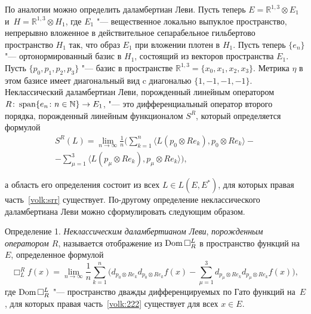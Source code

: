 По аналогии можно определить даламбертиан Леви. Пусть теперь $E=\mathbb{R}^{1,3}\otimes E_1$ и~$H=\mathbb{R}^{1,3}\otimes H_1$, где $E_1$ "--- вещественное локально выпуклое пространство, непрерывно вложенное в действительное
 сепарабельное гильбертово пространство $H_1$ так, что
 образ $E_1$ при вложении плотен в $H_1$. 
 Пусть теперь $\{e_n\}$ "---  ортонормированный базис в $H_1$, состоящий из векторов пространства
$E_1$.
Пусть $\{p_0, p_1, p_2, p_3\}$ "--- базис в пространстве $\mathbb{R}^{1,3}=\{x_0,x_1,x_2,x_3\}$. 
Метрика $\eta$ в этом базисе
имеет диагональный вид c диагональю \mbox{$\{1,-1,-1,-1\}$.}
Неклассический даламбертиан Леви, порожденный линейным  оператором \linebreak 
$R\colon \mathop{\rm span} \{e_n\colon n\in \mathbb{N}\}\to E_1$,
 "--- это дифференциальный оператор второго порядка,
 порожденный линейным  функционалом $S^R$, который определяется формулой
\begin{multline}
\label{volk:srr}
S^R(L)=\lim_{n\to\infty}\frac 1n
\biggl(\sum_{k=1}^n 
\langle L(p_0\otimes Re_k),p_0\otimes Re_k\rangle-\\-\sum_{\mu=1}^3\langle L(p_\mu\otimes Re_k),p_\mu\otimes Re_k\rangle\biggr),
\end{multline}

\noindent
а область его определения  состоит из всех $L\in L(E,E^\ast)$, для которых правая часть~\eqref{volk:srr} существует.
По-другому определение неклассического даламбертиана Леви можно сформулировать следующим образом.

\smallskip

\hypertarget{volk:def1}{}

{\small \sc Определение 1.} {\it Неклассическим даламбертианом Леви}, {\it порожденным оператором $R$}, называется отображение из $\mathop{\rm Dom} \Box_R^L$ в пространство функций на $E$, определенное формулой
\begin{equation}
\label{volk:222}
\Box_L^Rf(x)=\lim_{n\to\infty}\frac 1n\sum_{k=1}^n 
\biggl(d_{p_0\otimes Re_k}d_{p_0\otimes Re_k}f(x)-\sum_{\mu=1}^3d_{p_\mu\otimes Re_k}d_{p_\mu\otimes Re_k}f(x)\biggr),
\end{equation}
где  $\mathop{\rm Dom} \Box_R^L$ "--- пространство дважды дифференцируемых по Гато функций на~$E$,
для которых правая часть~\eqref{volk:222} существует для всех $x\in E$.


